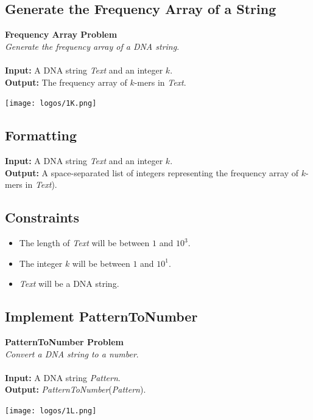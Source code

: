 \documentclass{article}
\begin{document}
\subsection{Generate the Frequency Array of a String}
\hline\vspace{5}
\noindent \textbf{Frequency Array Problem}\\
\emph{Generate the frequency array of a DNA string}.\\ \\
\textbf{Input:} A DNA string \emph{Text} and an integer $k$.\\
\textbf{Output:} The frequency array of $k$-mers in \emph{Text}.
\begin{center}
    \texttt{[image: logos/1K.png]} 
\end{center}
\hline\vspace{5}

\subsection*{Formatting}
\textbf{Input:} A DNA string \emph{Text} and an integer $k$.\\
\noindent \textbf{Output:} A space-separated list of integers representing the frequency array of $k$-mers in \emph{Text}).

\subsection*{Constraints}
\begin{itemize}
    \item The length of \emph{Text} will be between $1$ and $10^3$.
    \item The integer $k$ will be between $1$ and $10^1$.
    \item \emph{Text} will be a DNA string.
\end{itemize}
\pagebreak
\subsection{Implement PatternToNumber}
\hline\vspace{5}
\noindent \textbf{PatternToNumber Problem}\\
\emph{Convert a DNA string to a number}.\\ \\
\textbf{Input:} A DNA string \emph{Pattern}.\\
\textbf{Output:} \emph{PatternToNumber}(\emph{Pattern}).
\begin{center}
    \texttt{[image: logos/1L.png]} 
\end{center}
\hline\vspace{5}
\end{document}
